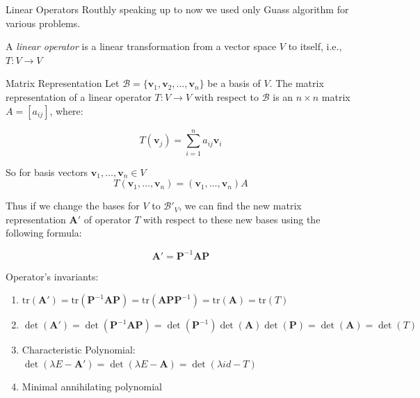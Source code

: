 \documentclass[fullscreen=true, bookmarks=true, hyperref={pdfencoding=unicode}]{beamer}
\begin{document}
\begin{frame}{Linear Operators}
  Routhly speaking up to now we used only Guass algorithm for various problems.
  
  \pause
  A \emph{linear operator} is a linear transformation from 
  a vector space $V$ to itself, i.e., $T: V \rightarrow V$
  
  \begin{block}{Matrix Representation}
  Let $\mathcal{B} = \{\mathbf{v}_1, \mathbf{v}_2, \dots, \mathbf{v}_n\}$ be a basis of $V$. The matrix representation of a linear operator $T: V \rightarrow V$ with respect to $\mathcal{B}$ is an $n \times n$ matrix $A = [a_{ij}]$, where:
  
  \[
  T(\mathbf{v}_j) = \sum_{i=1}^{n} a_{ij} \mathbf{v}_i
  \]
  \end{block}

  So for basis vectors $\mathbf{v}_1, \dots, \mathbf{v}_n \in V$
  $$\boxed{T(\mathbf{v}_1, \dots, \mathbf{v}_n) = (\mathbf{v}_1, \dots, \mathbf{v}_n)A}$$  
\end{frame}


\begin{frame}
  Thus if we change the bases for $V$ to $\mathcal{B}'_V$,  
  we can find the new matrix representation $\mathbf{A}'$ 
  of operator $T$ with respect to these new bases using the following formula:
  
  \[
  \mathbf{A}' = \mathbf{P}^{-1} \mathbf{A} \mathbf{P}
  \]

  \pause
  Operator's invariants:
  \begin{enumerate}
    \pause
    \item $\mathrm{tr} (\mathbf{A}') = 
    \mathrm{tr} (\mathbf{P}^{-1} \mathbf{A} \mathbf{P}) = 
    \mathrm{tr} (\mathbf{A} \mathbf{P} \mathbf{P}^{-1}) =
    \mathrm{tr} (\mathbf{A}) = \mathrm{tr} (T)$
    \pause
    \item $\det (\mathbf{A}') = 
    \det (\mathbf{P}^{-1} \mathbf{A} \mathbf{P}) = 
    \det (\mathbf{P}^{-1}) \det (\mathbf{A}) \det(\mathbf{P}) = 
    \det (\mathbf{A}) = \det ({T})$
    \pause
    \item Characteristic Polynomial: 
    $\det(\lambda E - \mathbf{A}') = \det(\lambda E - \mathbf{A}) = \det(\lambda id - T)$
    \pause
    \item Minimal annihilating polynomial
  \end{enumerate}
\end{frame}
\end{document}
